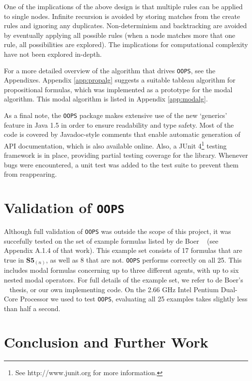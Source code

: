 \documentclass[11pt,a4paper]{article}
\begin{document}
One of the implications of the above design is that multiple rules can be applied to single nodes. Infinite recursion is avoided by storing matches from the create rules and ignoring any duplicates. Non-determinism and backtracking are avoided by eventually applying all possible rules (when a node matches more that one rule, all possibilities are explored). The implications for computational
complexity have not been explored in-depth.
\newline

For a more detailed overview of the algorithm that drives {\tt OOPS}, see the Appendixes. Appendix \ref{app:propalg} suggests a suitable tableau algorithm for propositional formulas, which was implemented as a prototype for the modal algorithm. This modal algorithm is listed in Appendix \ref{app:modalg}.
\newline

As a final note, the {\tt OOPS} package makes extensive use of the new `generics' feature in Java 1.5 in
order to ensure readability and type safety. Most of the code is covered by Javadoc-style comments that enable automatic generation of API documentation, which is also available online. Also, a JUnit 4\footnote{See http://www.junit.org for more information.} testing framework is in place, providing partial testing coverage for the library. Whenever bugs were encountered, a unit test was added to the test suite to prevent them from reappearing.

\section{Validation of {\tt OOPS}}
Although full validation of {\tt OOPS} was outside the scope of this project, it was succefully tested on the set of example formulas listed by de Boer ~\cite{these} (see Appendix A.1.4 of that work). This example set  consists of 17 formulas that are true in $\textbf{S5}_{(n)}$, as well as 8 that are not. {\tt OOPS} performs correctly on all 25. This includes modal formulas concerning up to three different agents, with up to six nested modal operators. For full details of the example set, we refer to de Boer's ~\cite{these} thesis, or our own implementing code. On the 2.66 GHz Intel Pentium Dual-Core Processor we used to test {\tt OOPS}, evaluating all 25 examples takes slightly less than half a second.

\label{val}

\section{Conclusion and Further Work}
\label{more}
\end{document}
